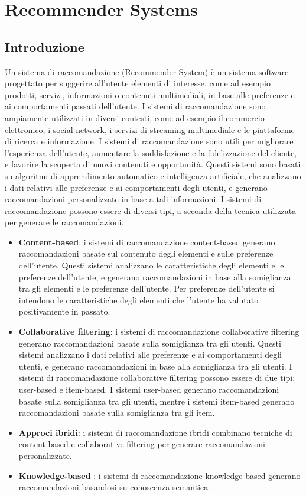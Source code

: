 \section{Recommender Systems}

\subsection{Introduzione}

Un sistema di raccomandazione (Recommender System) \cite{RecommenderOverview} è un sistema software progettato per suggerire all'utente elementi di interesse, come ad esempio prodotti, servizi, informazioni o contenuti multimediali, in base alle preferenze e ai comportamenti passati dell'utente. I sistemi di raccomandazione sono ampiamente utilizzati in diversi contesti, come ad esempio il commercio elettronico, i social network, i servizi di streaming multimediale e le piattaforme di ricerca e informazione. I sistemi di raccomandazione sono utili per migliorare l'esperienza dell'utente, aumentare la soddisfazione e la fidelizzazione del cliente, e favorire la scoperta di nuovi contenuti e opportunità.
Questi sistemi sono basati su algoritmi di apprendimento automatico e intelligenza artificiale, che analizzano i dati relativi alle preferenze e ai comportamenti degli utenti, e generano raccomandazioni personalizzate in base a tali informazioni. I sistemi di raccomandazione possono essere di diversi tipi, a seconda della tecnica utilizzata per generare le raccomandazioni.
\begin{itemize}
    \item \textbf{Content-based}: i sistemi di raccomandazione content-based generano raccomandazioni basate sul contenuto degli elementi e sulle preferenze dell'utente. Questi sistemi analizzano le caratteristiche degli elementi e le preferenze dell'utente, e generano raccomandazioni in base alla somiglianza tra gli elementi e le preferenze dell'utente. Per preferenze dell'utente si intendono le caratteristiche degli elementi che l'utente ha valutato positivamente in passato.
    
    \item \textbf{Collaborative filtering}: i sistemi di raccomandazione collaborative filtering generano raccomandazioni basate sulla somiglianza tra gli utenti. Questi sistemi analizzano i dati relativi alle preferenze e ai comportamenti degli utenti, e generano raccomandazioni in base alla somiglianza tra gli utenti. I sistemi di raccomandazione collaborative filtering possono essere di due tipi: user-based e item-based. I sistemi user-based generano raccomandazioni basate sulla somiglianza tra gli utenti, mentre i sistemi item-based generano raccomandazioni basate sulla somiglianza tra gli item.
    \item \textbf{Approci ibridi}: i sistemi di raccomandazione ibridi combinano tecniche di content-based e collaborative filtering per generare raccomandazioni personalizzate.
    \item \textbf{Knowledge-based} \cite{KnowledgeBased}: i sistemi di raccomandazione knowledge-based generano raccomandazioni basandosi su conoscenza semantica
\end{itemize}


